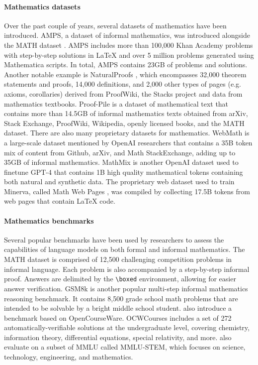\paragraph{Mathematics datasets} Over the past couple of years, several datasets of mathematics have been introduced. AMPS, a dataset of informal mathematics, was introduced alongside the MATH dataset \citep{mathdataset}. AMPS includes more than 100,000 Khan Academy problems with step-by-step solutions in LaTeX and over 5 million problems generated using Mathematica scripts. In total, AMPS contains 23GB of problems and solutions. Another notable example is NaturalProofs \citep{welleck2021naturalproofs}, which encompasses 32,000 theorem statements and proofs, 14,000 definitions, and 2,000 other types of pages (e.g. axioms, corollaries) derived from ProofWiki, the Stacks project and data from mathematics textbooks. Proof-Pile \citep{azerbayev2023proofnet} is a dataset of mathematical text that contains more than 14.5GB of informal mathematics texts obtained from arXiv, Stack Exchange, ProofWiki, Wikipedia, openly licensed books, and the MATH dataset. There are also many proprietary datasets for mathematics. WebMath is a large-scale dataset mentioned by OpenAI researchers \citep{polu2020generative} that contains a 35B token mix of content from Github, arXiv, and Math StackExchange, adding up to 35GB of informal mathematics. MathMix is another OpenAI dataset used to finetune GPT-4 \citep{verify-step-by-step} that contains 1B high quality mathematical tokens containing both natural and synthetic data. The proprietary web dataset used to train Minerva, called Math Web Pages \citep{lewkowycz2022solving}, was compiled by collecting 17.5B tokens from web pages that contain \LaTeX{} code.

\paragraph{Mathematics benchmarks} Several popular benchmarks have been used by researchers to assess the capabilities of language models on both formal and informal mathematics. The MATH dataset \citep{mathdataset} is comprised of 12,500 challenging competition problems in informal language. Each problem is also accompanied by a step-by-step informal proof. Answers are delimited by the \texttt{\textbackslash boxed} environment, allowing for easier answer verification. GSM8k \citep{cobbe2021training} is another popular multi-step informal mathematics reasoning benchmark. It contains 8,500 grade school math problems that are intended to be solvable by a bright middle school student. \citet{lewkowycz2022solving} also introduce a benchmark based on OpenCourseWare. OCWCourses includes a set of 272 automatically-verifiable solutions at the undergraduate level, covering chemistry, information theory, differential equations, special relativity, and more. \citet{lewkowycz2022solving} also evaluate on a subset of MMLU \citep{hendrycks2020measuring} called MMLU-STEM, which focuses on science, technology, engineering, and mathematics.

